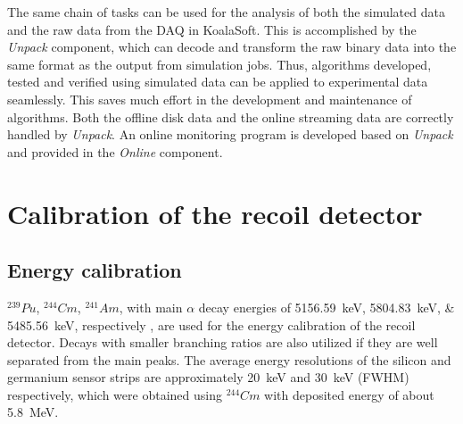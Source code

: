 \documentclass[number,5p]{elsarticle}
\begin{document}
The same chain of tasks can be used for the analysis of both the simulated data
and the raw data from the DAQ in KoalaSoft.
This is accomplished by the \textit{Unpack} component, which can decode and transform the raw binary data into the same format as the output from simulation jobs.
Thus, algorithms developed, tested and verified using simulated data can be applied to experimental data seamlessly.
This saves much effort in the development and maintenance of algorithms.
Both the offline disk data and the online streaming data are correctly handled
by \textit{Unpack}.
An online monitoring program is developed based on \textit{Unpack} and provided
in the \textit{Online} component.

\section{Calibration of the recoil detector}
\label{sec:calibration}

\subsection{Energy calibration}
\label{sec:calibration}

\(^{239}Pu\), \(^{244}Cm\), \(^{241}Am\), with main $\alpha$ decay energies
of \SIlist{5156.59;5804.83;5485.56}{\keV}, respectively \cite{nuclear_data}, are
used for the energy calibration of the recoil detector.
Decays with smaller branching ratios are also utilized if they are well separated from the main peaks.
The average energy resolutions of the silicon and germanium
sensor strips are approximately \SI{20}{\keV} and \SI{30}{\keV} (FWHM)
respectively, which were obtained using $^{244}Cm$ with deposited energy of
about \SI{5.8}{\MeV}.
\end{document}
